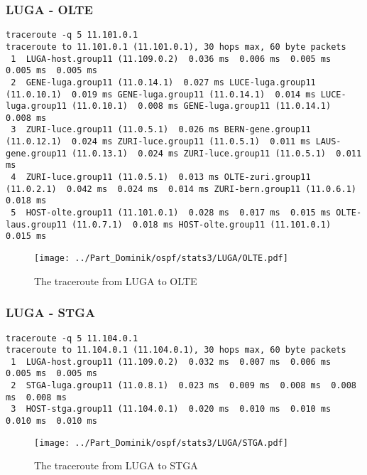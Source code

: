 \subsubsection{LUGA - OLTE}
\begin{lstlisting}
traceroute -q 5 11.101.0.1
traceroute to 11.101.0.1 (11.101.0.1), 30 hops max, 60 byte packets
 1  LUGA-host.group11 (11.109.0.2)  0.036 ms  0.006 ms  0.005 ms  0.005 ms  0.005 ms
 2  GENE-luga.group11 (11.0.14.1)  0.027 ms LUCE-luga.group11 (11.0.10.1)  0.019 ms GENE-luga.group11 (11.0.14.1)  0.014 ms LUCE-luga.group11 (11.0.10.1)  0.008 ms GENE-luga.group11 (11.0.14.1)  0.008 ms
 3  ZURI-luce.group11 (11.0.5.1)  0.026 ms BERN-gene.group11 (11.0.12.1)  0.024 ms ZURI-luce.group11 (11.0.5.1)  0.011 ms LAUS-gene.group11 (11.0.13.1)  0.024 ms ZURI-luce.group11 (11.0.5.1)  0.011 ms
 4  ZURI-luce.group11 (11.0.5.1)  0.013 ms OLTE-zuri.group11 (11.0.2.1)  0.042 ms  0.024 ms  0.014 ms ZURI-bern.group11 (11.0.6.1)  0.018 ms
 5  HOST-olte.group11 (11.101.0.1)  0.028 ms  0.017 ms  0.015 ms OLTE-laus.group11 (11.0.7.1)  0.018 ms HOST-olte.group11 (11.101.0.1)  0.015 ms
\end{lstlisting}
\begin{figure}[H]
\centering
\texttt{[image: ../Part\_Dominik/ospf/stats3/LUGA/OLTE.pdf]}
\caption{The traceroute from LUGA to OLTE}
\end{figure}
\clearpage
\subsubsection{LUGA - STGA}
\begin{lstlisting}
traceroute -q 5 11.104.0.1
traceroute to 11.104.0.1 (11.104.0.1), 30 hops max, 60 byte packets
 1  LUGA-host.group11 (11.109.0.2)  0.032 ms  0.007 ms  0.006 ms  0.005 ms  0.005 ms
 2  STGA-luga.group11 (11.0.8.1)  0.023 ms  0.009 ms  0.008 ms  0.008 ms  0.008 ms
 3  HOST-stga.group11 (11.104.0.1)  0.020 ms  0.010 ms  0.010 ms  0.010 ms  0.010 ms
\end{lstlisting}
\begin{figure}[H]
\centering
\texttt{[image: ../Part\_Dominik/ospf/stats3/LUGA/STGA.pdf]}
\caption{The traceroute from LUGA to STGA}
\end{figure}
\clearpage
